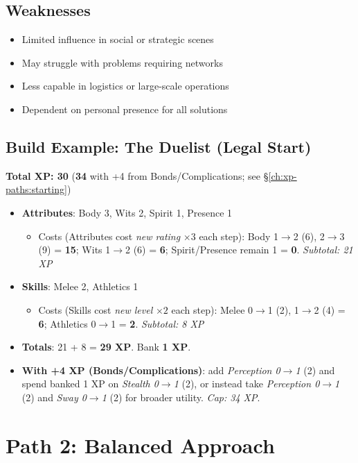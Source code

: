 \subsection*{Weaknesses}
\begin{itemize}
\item Limited influence in social or strategic scenes
\item May struggle with problems requiring networks
\item Less capable in logistics or large-scale operations
\item Dependent on personal presence for all solutions
\end{itemize}

\subsection*{Build Example: The Duelist (Legal Start)}
\textbf{Total XP: 30} \quad (\textbf{34} with +4 from Bonds/Complications; see \S\ref{ch:xp-paths:starting})
\begin{itemize}
\item \textbf{Attributes}: Body 3, Wits 2, Spirit 1, Presence 1
  \begin{itemize}
  \item Costs (Attributes cost \emph{new rating} $\times 3$ each step): Body 1$\to$2 (6), 2$\to$3 (9) = \textbf{15}; Wits 1$\to$2 (6) = \textbf{6}; Spirit/Presence remain 1 = \textbf{0}. \emph{Subtotal: 21 XP}
  \end{itemize}
\item \textbf{Skills}: Melee 2, Athletics 1
  \begin{itemize}
  \item Costs (Skills cost \emph{new level} $\times 2$ each step): Melee 0$\to$1 (2), 1$\to$2 (4) = \textbf{6}; Athletics 0$\to$1 = \textbf{2}. \emph{Subtotal: 8 XP}
  \end{itemize}
\item \textbf{Totals}: 21 + 8 = \textbf{29 XP}. Bank \textbf{1 XP}.
\item \textbf{With +4 XP (Bonds/Complications)}: add \emph{Perception 0$\to$1} (2) and spend banked 1 XP on \emph{Stealth 0$\to$1} (2), or instead take \emph{Perception 0$\to$1} (2) and \emph{Sway 0$\to$1} (2) for broader utility. \emph{Cap: 34 XP}.
\end{itemize}

\section{Path 2: Balanced Approach}

